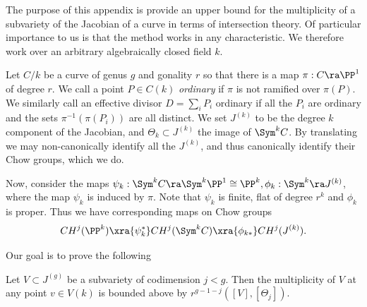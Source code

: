 The purpose of this appendix is provide an upper bound for the multiplicity of a subvariety of the Jacobian of a curve in terms of intersection theory. Of particular importance to
us is that the method works in any characteristic. We therefore work over an arbitrary algebraically closed field $k$.

Let $C/k$ be a curve of genus $g$ and gonality $r$ so that there is a map $\pi:C\ra \PP^1$ of degree $r$. We call a point $P\in C(k)$ \emph{ordinary}
if $\pi$ is not ramified over $\pi(P)$. We similarly call an effective divisor $D=\sum_i P_i$ ordinary if all the $P_i$ are ordinary and the sets $\pi^{-1}(\pi(P_i))$ are all distinct.
We set  $J^{(k)}$ to be the degree $k$ component of the Jacobian, and $\Theta_k\subset J^{(k)}$ the image of $\Sym^kC$. By translating we
may non-canonically identify all the $J^{(k)}$, and thus canonically identify their Chow groups, which we do.

Now, consider the maps $\psi_k:\Sym^k C \ra \Sym^k\PP^1 \cong \PP^k, \phi_k:\Sym^k \ra J^{(k)}$, where the map $\psi_k$ is induced by $\pi$. Note that $\psi_k$ is finite, flat of degree
$r^k$ and $\phi_k$ is proper. Thus we have corresponding maps on Chow groups \[CH^j(\PP^k)\xra{\psi_k^*} CH^j(\Sym^k C)\xra{\phi_{k*}} CH^j(J^{(k)}).\]

Our goal is to prove the following

\begin{theorem}
\notready\label{appendix}

Let $V\subset J^{(g)}$ be a subvariety of codimension $j<g$. Then the multiplicity of $V$ at any point $v\in V(k)$ is bounded above by $r^{g-1-j} ([V],[\Theta_j])$.

\end{theorem}

